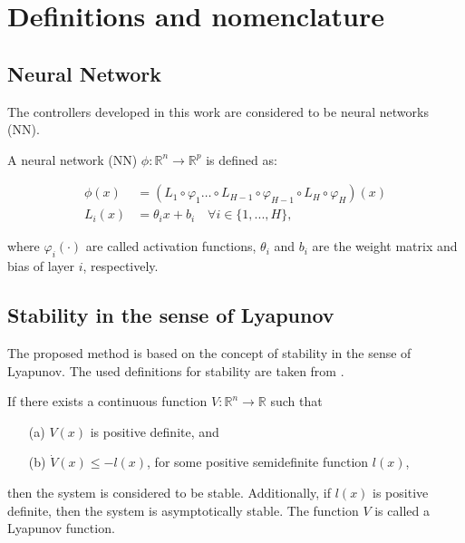 \section{Definitions and nomenclature}

\subsection{Neural Network}
The controllers developed in this work are considered to be neural networks (NN). 

\begin{definition}
    A neural network (NN) $\phi:\mathbb{R}^n\rightarrow \mathbb{R}^p$ is defined as:
   
     \begin{equation}
      \begin{aligned}
        \phi (x) & = (L_1 \circ \varphi_1 \dots \circ L_{H-1} \circ \varphi_{H-1} \circ L_{H} \circ \varphi_H)(x)\\
        L_i(x) &= \theta_i x + b_i \quad \forall i\in\{1,..., H\},
      \end{aligned}
    \end{equation}
  
     where $\varphi_i(\cdot)$ are called  activation functions, $\theta_i$ and $b_i$ are the weight matrix and bias of layer $i$, respectively.
\end{definition}


\subsection{Stability in the sense of Lyapunov}
The proposed method is based on the concept of stability in the sense of Lyapunov. The used definitions for stability are taken from \cite{khalilNonlinearSystems1996}.

\begin{definition}
    
\end{definition}


\begin{definition}
    If there exists a continuous function $V: \mathbb{R}^n \rightarrow \mathbb{R}$ such that
     \begin{enumerate}
       \item[(a)] $V(x)$ is positive definite, and
       \item[(b)] $\dot{V}(x)\leq-l(x)$, for some positive semidefinite function $l(x)$,
     \end{enumerate}
    then the system is considered to be stable. Additionally, if $l(x)$ is positive definite, then the system is asymptotically stable. The function $V$ is called a Lyapunov function.
     \label{def:lyapunov-stability}
\end{definition}

